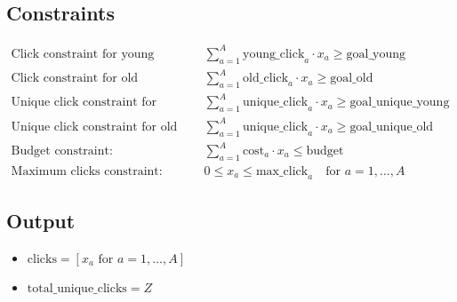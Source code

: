 \documentclass{article}
\begin{document}
\subsection*{Constraints}
\begin{align*}
    \text{Click constraint for young visitors:} & \quad \sum_{a=1}^{A} \text{young\_click}_{a} \cdot x_a \geq \text{goal\_young} \\
    \text{Click constraint for old visitors:} & \quad \sum_{a=1}^{A} \text{old\_click}_{a} \cdot x_a \geq \text{goal\_old} \\
    \text{Unique click constraint for young visitors:} & \quad \sum_{a=1}^{A} \text{unique\_click}_{a} \cdot x_a \geq \text{goal\_unique\_young} \\
    \text{Unique click constraint for old visitors:} & \quad \sum_{a=1}^{A} \text{unique\_click}_{a} \cdot x_a \geq \text{goal\_unique\_old} \\
    \text{Budget constraint:} & \quad \sum_{a=1}^{A} \text{cost}_{a} \cdot x_a \leq \text{budget} \\
    \text{Maximum clicks constraint:} & \quad 0 \leq x_a \leq \text{max\_click}_{a} \quad \text{for } a = 1, \ldots, A
\end{align*}

\subsection*{Output}
\begin{itemize}
    \item \( \text{clicks} = [x_a \text{ for } a = 1, \ldots, A] \)
    \item \( \text{total\_unique\_clicks} = Z \)
\end{itemize}
\end{document}
